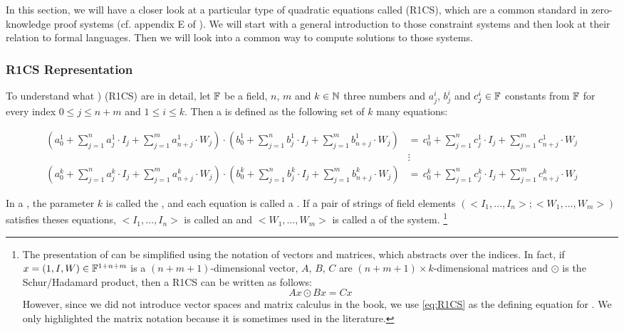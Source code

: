 In this section, we will have a closer look at a particular type of quadratic equations called  (R1CS), which are a common standard in zero-knowledge proof systems (cf. appendix E of \cite{sasson-2013}). We will start with a general introduction to those constraint systems and then look at their relation to formal languages. Then we will look into a common way to compute solutions to those systems. 

\subsubsection{R1CS Representation} To understand what ) (R1CS) are in detail, let $\mathbb{F}$ be a field, $n$, $m$ and $k\in\mathbb{N}$ three numbers and $a_j^i$, $b_j^i$ and $c_j^i\in\mathbb{F}$ constants from $\mathbb{F}$ for every index $0\leq j \leq n+m$ and $1\leq i \leq k$. Then a  is defined as the following set of $k$ many equations: 

\begin{definition}\label{R1CS}
\begin{equation}\label{eq:R1CS}
\begin{split}
\scriptstyle\left(a^1_0 + \sum_{j=1}^n a^1_j \cdot I_j + \sum_{j=1}^m a^1_{n+j} \cdot W_j  \right) \cdot 
\left(b^1_0 + \sum_{j=1}^n b^1_j \cdot I_j + \sum_{j=1}^m b^1_{n+j} \cdot W_j  \right) &=\, 
\scriptstyle c^1_0 + \sum_{j=1}^n c^1_j \cdot I_j + \sum_{j=1}^m c^1_{n+j} \cdot W_j\\
       & \vdots\\
\scriptstyle\left(a^k_0 + \sum_{j=1}^n a^k_j \cdot I_j + \sum_{j=1}^m a^k_{n+j} \cdot W_j  \right) \cdot 
\left(b^k_0 + \sum_{j=1}^n b^k_j \cdot I_j + \sum_{j=1}^m b^k_{n+j} \cdot W_j  \right) &=\, 
\scriptstyle c^k_0 + \sum_{j=1}^n c^k_j \cdot I_j + \sum_{j=1}^m c^k_{n+j} \cdot W_j       
\end{split}
\end{equation}
\end{definition}

In a , the parameter $k$ is called the , and each equation is called a . If a pair of strings of field elements $(<I_1,\ldots, I_n>; <W_1,\ldots,W_m>)$  satisfies theses equations, $<I_1,\ldots, I_n>$ is called an  and $<W_1,\ldots,W_m>$ is called a  of the system.%
\footnote{The presentation of  can be simplified using the notation of vectors and matrices, which abstracts over the indices. In fact, if $x= (1,I,W)\in \mathbb{F}^{1+n+m}$ is a $(n+m+1)$-dimensional vector, $A$, $B$, $C$ are $(n+m+1)\times k$-dimensional matrices and $\odot$ is the Schur/Hadamard product, then a R1CS can be written as follows:
$$
Ax \odot Bx = Cx
$$
However,  since we did not introduce vector spaces and matrix calculus in the book, we use \ref{eq:R1CS} as the defining equation for . We only highlighted the matrix notation because it is sometimes used in the literature.}

